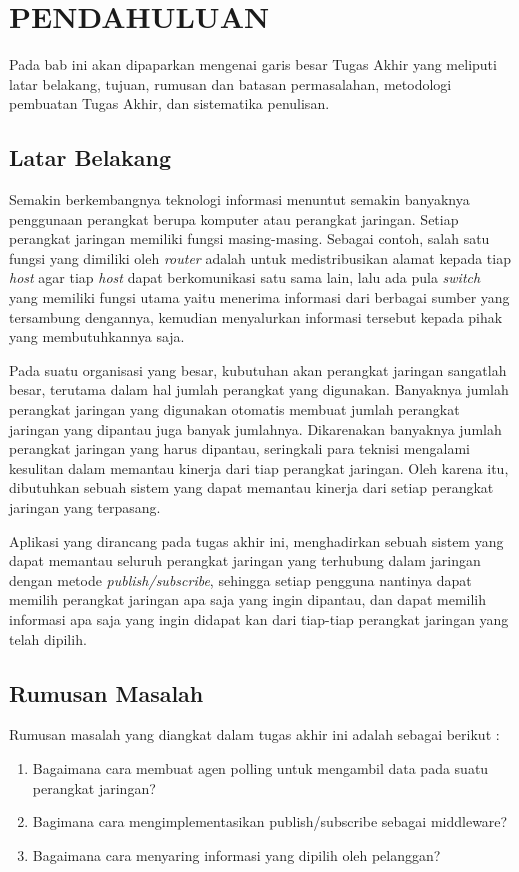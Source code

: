 \chapter{PENDAHULUAN}
	Pada bab ini akan dipaparkan mengenai garis besar Tugas Akhir yang meliputi latar belakang, tujuan, rumusan dan batasan permasalahan, metodologi pembuatan Tugas Akhir, dan sistematika penulisan.
        
	\section{Latar Belakang}
		Semakin berkembangnya teknologi informasi menuntut semakin banyaknya penggunaan perangkat berupa komputer atau perangkat jaringan. Setiap perangkat jaringan memiliki fungsi masing-masing. Sebagai contoh, salah satu fungsi yang dimiliki oleh \textit{router} adalah untuk medistribusikan alamat kepada tiap \textit{host} agar tiap \textit{host} dapat berkomunikasi satu sama lain, lalu ada pula \textit{switch} yang memiliki fungsi utama yaitu menerima informasi dari berbagai sumber yang tersambung dengannya, kemudian menyalurkan informasi tersebut kepada pihak yang membutuhkannya saja.
		
		Pada suatu organisasi yang besar, kubutuhan akan perangkat jaringan sangatlah besar, terutama dalam hal jumlah perangkat yang digunakan. Banyaknya jumlah perangkat jaringan yang digunakan otomatis membuat jumlah perangkat jaringan yang dipantau juga banyak jumlahnya. Dikarenakan banyaknya jumlah perangkat jaringan yang harus dipantau, seringkali para teknisi mengalami kesulitan dalam memantau kinerja dari tiap perangkat jaringan. Oleh karena itu, dibutuhkan sebuah sistem yang dapat memantau kinerja dari setiap perangkat jaringan yang terpasang.
		
		Aplikasi yang dirancang pada tugas akhir ini, menghadirkan sebuah sistem yang dapat memantau seluruh perangkat jaringan yang terhubung dalam jaringan dengan metode \textit{publish/subscribe}, sehingga setiap pengguna nantinya dapat memilih perangkat jaringan apa saja yang ingin dipantau, dan dapat memilih informasi apa saja yang ingin didapat kan dari tiap-tiap perangkat jaringan yang telah dipilih.

	\section{Rumusan Masalah}
       	Rumusan masalah yang diangkat dalam tugas akhir ini adalah sebagai berikut :
		\begin{enumerate}
			\item Bagaimana cara membuat agen polling untuk mengambil data pada suatu perangkat jaringan?
			\item Bagimana cara mengimplementasikan publish/subscribe sebagai middleware?
            \item Bagaimana cara menyaring informasi yang dipilih oleh pelanggan?
		\end{enumerate}

